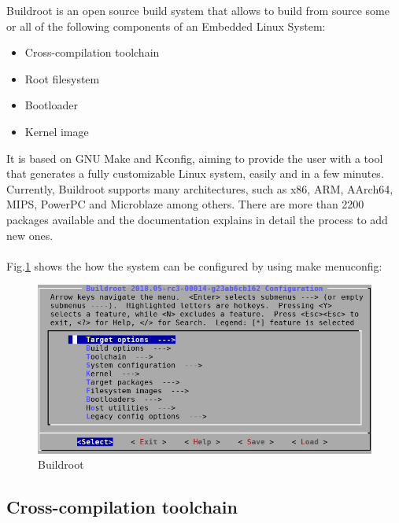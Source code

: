 \documentclass[12pt,a4paper,oneside]{article}
\begin{document}
Buildroot is an open source build system that allows to build from source some
or all of the following components of an Embedded Linux System:
\begin{itemize}
  \item Cross-compilation toolchain
  \item Root filesystem
  \item Bootloader
  \item Kernel image
\end{itemize}
It is based on GNU Make and Kconfig, aiming to provide the user with a tool that
generates a fully customizable Linux system, easily and in a few minutes. Currently,
Buildroot supports many architectures, such as x86, ARM, AArch64, MIPS, PowerPC
and Microblaze among others. There are more than 2200 packages available and the
documentation explains in detail the process to add new ones.\\\\
Fig.\ref{fig:menuconfig} shows the how the system can be configured by using
{\selectfont make menuconfig}:
\begin{figure}[H]
\centering
  \includegraphics[scale=0.5]{img/menuconfig.png}
  \caption{Buildroot}
  \label{fig:menuconfig}
\end{figure}

\subsection{Cross-compilation toolchain}
\end{document}
